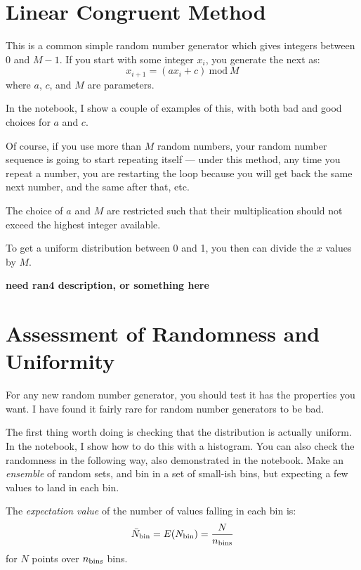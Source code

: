 \section{Linear Congruent Method}

This is a common simple random number generator which gives integers
between 0 and $M-1$. If you start with some integer $x_i$, you
generate the next as:
\begin{equation}
x_{i+1} = (a x_i +c) \mathrm{~mod~} M
\end{equation}
where $a$, $c$, and $M$ are parameters. 

In the notebook, I show a couple of examples of this, with both bad
and good choices for $a$ and $c$.

Of course, if you use more than $M$ random numbers, your random number
sequence is going to start repeating itself --- under this method, any
time you repeat a number, you are restarting the loop because you will
get back the same next number, and the same after that, etc.

The choice of $a$ and $M$ are restricted such that their
multiplication should not exceed the highest integer available.

To get a uniform distribution between 0 and 1, you then can divide the
$x$ values by $M$.

{\bf need ran4 description, or something here}

\section{Assessment of Randomness and Uniformity}

For any new random number generator, you should test it has the
properties you want. I have found it fairly rare for random number
generators to be bad.

The first thing worth doing is checking that the distribution is
actually uniform. In the notebook, I show how to do this with a
histogram. You can also check the randomness in the following way,
also demonstrated in the notebook. Make an {\it ensemble} of random
sets, and bin in a set of small-ish bins, but expecting a few values
to land in each bin.

The {\it expectation value} of the number of values falling in each
bin is:
\begin{equation}
{\bar N}_{\rm bin} = E(N_{\rm bin}) = \frac{N}{n_{\rm bins}}
\end{equation}
for $N$ points over $n_{\rm bins}$ bins. 

